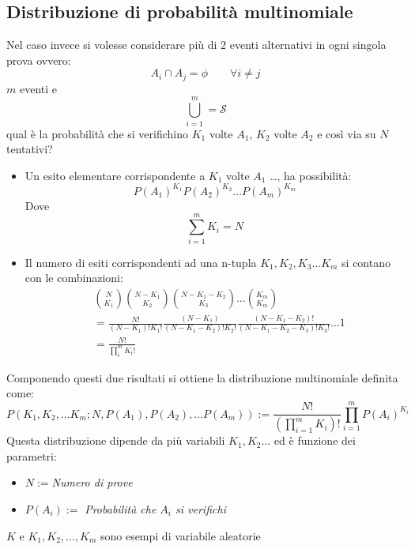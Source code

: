 \documentclass[11pt,a4paper]{book}
\begin{document}
\subsection{Distribuzione di probabilità multinomiale} 
Nel caso invece si volesse considerare più di $ 2 $ eventi alternativi in ogni singola prova ovvero:
\begin{equation}
A_i \cap A_j = \phi \qquad \forall i \neq j
\end{equation}
$ m $ eventi e
\begin{equation}
\bigcup \limits_{i = 1}^{m} = \mathcal{S}
\end{equation}
qual è la probabilità che si verifichino $ K_1 $ volte $ A_1 $, $ K_2 $ volte $ A_2 $ e così via su $ N $ tentativi?
\begin{itemize}
\item Un esito elementare corrispondente a $ K_1 $ volte $ A_1 $ \dots, ha possibilità:
\begin{equation}
P(A_1)^{K_1} P(A_2)^{K_2} \dots P(A_m)^{K_m}
\end{equation}
Dove 
\begin{equation}
\sum\limits_{i = 1}^{m} K_i =N
\end{equation}
\item Il numero di esiti corrispondenti ad una n-tupla $ K_1,K_2,K_3\dots K_m $ si contano con le combinazioni:
\begin{align}
& \binom{N}{K_1} \binom{N-K_1}{K_2}\binom{N-K_1-K_2}{K_3} \dots \binom{K_m}{K_m} \\
 & =  \frac{N!}{(N-K_1)!K_1!} \frac{(N-K_1)}{(N-K_1-K_2)!K_2!} \frac{(N-K_1-K_2)!}{(N-K_1-K_2-K_3)!K_3!} \dots 1 \\
 & =  \frac{N!}{\prod\limits_i^m K_i !}
\end{align}
\end{itemize}
Componendo questi due risultati si ottiene la distribuzione multinomiale definita come:
\begin{equation}
P(K_1,K_2, \dots K_m;N,P(A_1),P(A_2),\dots P(A_m)) :=\frac{N!}{\left( \prod\limits_{i = 1}^{m}K_i\right)! }\prod\limits_{i = 1}^{m}P(A_i)^{K_i}
\end{equation}
Questa distribuzione dipende da più variabili $ K_1 , K_2 \dots $ ed è funzione dei parametri:
\begin{itemize}
\item $ N:= $\textit{Numero di prove}
\item $ P(A_i) :=$ \textit{Probabilità che $ A_i $ si verifichi}
\end{itemize}
$ K $ e $ K_1, K_2, \dots , K_m $ sono esempi di variabile aleatorie
\end{document}
